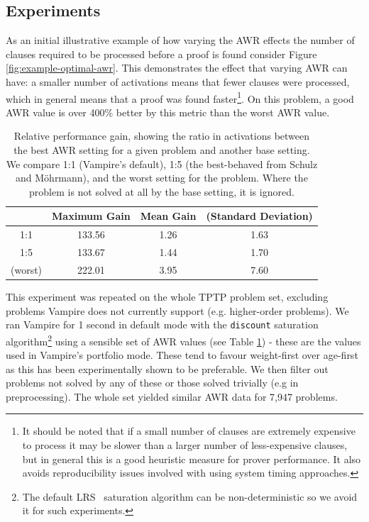 \documentclass{llncs}
\newcommand{\sandm}{Schulz and M{\"{o}}hrmann}
\begin{document}
\subsection{Experiments}
As an initial illustrative example of how varying the AWR effects the number of clauses required to be processed before a proof is found consider Figure \ref{fig:example-optimal-awr}. This demonstrates the effect that varying AWR can have: a smaller number of activations means that fewer clauses were processed, which in general means that a proof was found faster\footnote{
It should be noted that if a small number of clauses are extremely expensive to process it may be slower than a larger number of less-expensive clauses, but in general this is a good heuristic measure for prover performance.
It also avoids reproducibility issues involved with using system timing approaches.
}.
On this problem, a good AWR value is over 400\% better by this metric than the worst AWR value.

\begin{table}[t]
	\caption{
Relative performance gain, showing the ratio in activations between the best AWR setting for a given problem and another base setting.
We compare  1:1 (Vampire's default), 1:5 (the best-behaved from \sandm), and the worst setting for the problem.
Where the problem is not solved at all by the base setting, it is ignored.
}
	\centering
	\begin{tabular}{c | c | c c}
		& Maximum Gain & Mean Gain & (Standard Deviation)\\
		\hline
		1:1 & 133.56 & 1.26 & 1.63 \\
		1:5 & 133.67 & 1.44 & 1.70 \\
		(worst) & 222.01 & 3.95 & 7.60 \\
	\end{tabular}
	\label{tab:awr-improvement}
\end{table}

This experiment was repeated on the whole TPTP problem set, excluding problems Vampire does not currently support (e.g. higher-order problems). We ran Vampire for 1 second in default mode with the \texttt{discount} saturation algorithm\footnote{The default LRS~\cite{LRS} saturation algorithm can be non-deterministic so we avoid it for such experiments.} using a sensible set of AWR values (see Table \ref{tab:awr-improvement}) - these are the values used in Vampire's portfolio mode. These tend to favour weight-first over age-first as this has been experimentally shown to be preferable. We then filter out problems not solved by any of these or those solved trivially (e.g in preprocessing). The whole set yielded similar AWR data for 7,947 problems. 
%
\end{document}
